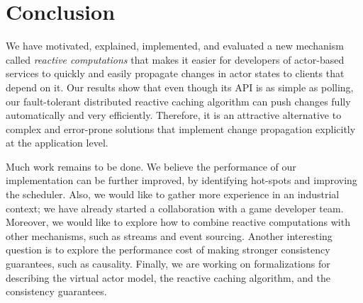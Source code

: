 \section{Conclusion}

We have motivated, explained, implemented, and evaluated a new mechanism called \emph{reactive computations} that makes it easier for developers of actor-based services to quickly and easily propagate changes in actor states to clients that depend on it. Our results show that even though its API is as simple as polling, our fault-tolerant distributed reactive caching algorithm can push changes fully automatically and very efficiently. Therefore, it is an attractive alternative to complex and error-prone solutions that implement change propagation explicitly at the application level. 

Much work remains to be done. We believe the performance of our implementation can be further improved, by identifying hot-spots and improving the scheduler. Also, we would like to gather more experience in an industrial context; we have already started a collaboration with a game developer team. Moreover, we would like to explore how to combine reactive computations with other mechanisms, such as streams and event sourcing. Another interesting question is to explore the performance cost of making stronger consistency guarantees, such as causality. Finally, we are working on formalizations for describing the virtual actor model, the reactive caching algorithm, and the consistency guarantees.